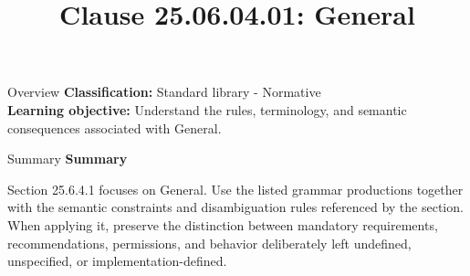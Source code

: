 \documentclass[10pt,letterpaper]{article}
\title{Clause 25.06.04.01: General}
\author{}
\date{}
\begin{document}
\maketitle
\begin{CornellOverviewBox}{Overview}
\textbf{Classification:} Standard library - Normative\\[2pt]
\textbf{Learning objective:} Understand the rules, terminology, and semantic consequences associated with General.
\end{CornellOverviewBox}\begin{CornellSummaryBox}{Summary}
{\sffamily\bfseries\color{Accent} Summary}\par\vspace{3pt}Section 25.6.4.1 focuses on General. Use the listed grammar productions together with the semantic constraints and disambiguation rules referenced by the section. When applying it, preserve the distinction between mandatory requirements, recommendations, permissions, and behavior deliberately left undefined, unspecified, or implementation-defined.
\end{CornellSummaryBox}
\end{document}
